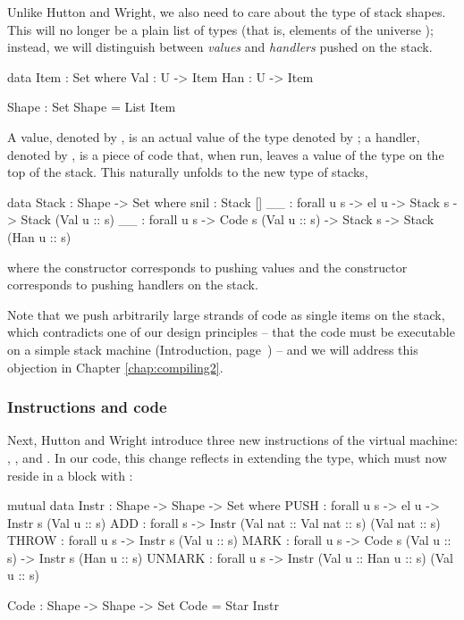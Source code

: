 Unlike Hutton and Wright, we also need to care about the type of stack shapes.
This will no longer be a plain
list of types (that is, elements of the universe ); instead, we  will
distinguish between \emph{values} and \emph{handlers} pushed on the stack.
\begin{code}
  data Item : Set where
    Val : U -> Item
    Han : U -> Item

  Shape : Set
  Shape = List Item
\end{code}
A value, denoted by , is an actual value of the type
denoted by ; a handler, denoted by , is a piece of code
that, when run, leaves a value of the type  on the top of the stack.
This naturally unfolds to the new type of stacks,
\begin{code}
  data Stack : Shape -> Set where
    snil : Stack []
    _\scons\_ : forall {u s} -> el u -> Stack s -> Stack (Val u :: s)
    _\sconsh\_ : forall {u s} -> Code s (Val u :: s) -> Stack s -> Stack (Han u :: s)
\end{code}
where the constructor \ident{\scons\!\!} corresponds to pushing values and the
constructor \ident{\sconsh\!\!} corresponds to pushing handlers on the stack.

Note that we push arbitrarily large strands of code as single items on the stack,
which contradicts one of our design principles -- that the
code must be executable on a simple stack machine (Introduction, page~\pageref{objectives})
-- and we will address this objection in Chapter \ref{chap:compiling2}.

\subsubsection{Instructions and code}

Next, Hutton and Wright introduce three new instructions of the virtual machine:
, , and . In our code, this change
reflects in extending the  type, which must now reside in a
 block with :

\begin{code}
  mutual
    data Instr : Shape -> Shape -> Set where
      PUSH : forall {u s} -> el u -> Instr s (Val u :: s)
      ADD : forall s -> Instr (Val nat :: Val nat :: s) (Val nat :: s)
      THROW : forall {u s} -> Instr s (Val u :: s)
      MARK : forall {u s} -> Code s (Val u :: s) -> Instr s (Han u :: s)
      UNMARK : forall {u s} -> Instr (Val u :: Han u :: s) (Val u :: s)

    Code : Shape -> Shape -> Set
    Code = Star Instr
\end{code}

